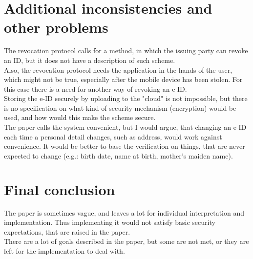 \documentclass{article}
\begin{document}
	\section{Additional inconsistencies and other problems}
		The revocation protocol calls for a method, in which the issuing party can revoke an ID, but it does not have a description of such scheme.\\
		Also, the revocation protocol needs the application in the hands of the user, which might not be true, especially after the mobile device has been stolen. For this case there is a need for another way of revoking an e-ID.\\
		Storing the e-ID securely by uploading to the "cloud" is not impossible, but there is no specification on what kind of security mechanism (encryption) would be used, and how would this make the scheme secure.\\
		The paper calls the system convenient, but I would argue, that changing an e-ID each time a personal detail changes, such as address, would work against convenience. It would be better to base the verification on things, that are never expected to change (e.g.: birth date, name at birth, mother's maiden name).
	\section{Final conclusion}
		The paper is sometimes vague, and leaves a lot for individual interpretation and implementation. Thus implementing it would not satisfy basic security expectations, that are raised in the paper.\\
		There are a lot of goals described in the paper, but some are not met, or they are left for the implementation to deal with.

	\clearpage
	\printbibliography
\end{document}
